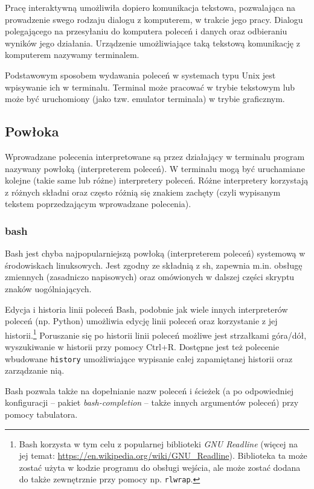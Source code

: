 Pracę interaktywną umożliwiła dopiero komunikacja tekstowa, pozwalająca na prowadzenie swego rodzaju dialogu z komputerem, w trakcie jego pracy.
Dialogu polegającego na przesyłaniu do komputera poleceń i danych oraz odbieraniu wyników jego działania.
Urządzenie umożliwiające taką tekstową komunikację z komputerem nazywamy terminalem.

Podstawowym sposobem wydawania poleceń w systemach typu Unix jest wpisywanie ich w terminalu.
Terminal może pracować w trybie tekstowym lub może być uruchomiony (jako tzw. emulator terminala) w trybie graficznym.

\subsection{Powłoka}

Wprowadzane polecenia interpretowane są przez działający w terminalu program nazywany powłoką (interpreterem poleceń).
W terminalu mogą być uruchamiane kolejne (takie same lub różne) interpretery poleceń.
Różne interpretery korzystają z różnych składni oraz często różnią się znakiem zachęty (czyli wypisanym tekstem poprzedzającym wprowadzane polecenia).

\subsubsection{bash}
Bash jest chyba najpopularniejszą powłoką (interpreterem poleceń) systemową w środowiskach linuksowych.
Jest zgodny ze składnią z sh, zapewnia m.in. obsługę zmiennych (zasadniczo napisowych) oraz omówionych w dalszej części skryptu znaków uogólniających.

\begin{ProTip}[breakable]{Edycja i historia linii poleceń}
Bash, podobnie jak wiele innych interpreterów poleceń (np. Python) umożliwia edycję linii poleceń oraz korzystanie z jej historii.\footnote{
	Bash korzysta w tym celu z popularnej biblioteki \textit{GNU Readline} (więcej na jej temat: \url{https://en.wikipedia.org/wiki/GNU\_Readline}).
	Biblioteka ta może zostać użyta w kodzie programu do obsługi wejścia, ale może zostać dodana do także zewnętrznie przy pomocy np. \Verb$rlwrap$.
}
Poruszanie się po historii linii poleceń możliwe jest strzałkami góra/dół, wyszukiwanie w historii przy pomocy Ctrl+R.
Dostępne jest też polecenie wbudowane \texttt{history} umożliwiające wypisanie całej zapamiętanej historii oraz zarządzanie nią.

Bash pozwala także na dopełnianie nazw poleceń i ścieżek (a po odpowiedniej konfiguracji – pakiet \textit{bash-completion} – także innych argumentów poleceń) przy pomocy tabulatora.
\end{ProTip}

